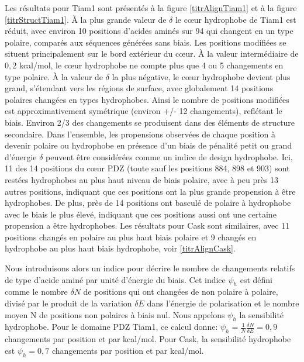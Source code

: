 Les résultats pour Tiam1 sont présentés à la figure \ref{titrAlignTiam1} et à la figure \ref{titrStructTiam1}. À la plus grande valeur de $\delta$ le cœur hydrophobe de Tiam1 est réduit, avec  environ 10 positions d'acides aminés sur 94 qui changent en un type polaire, comparés aux séquences générées sans biais. Les positions modifiées se situent principalement sur le bord extérieur du cœur. À la valeur intermédiaire de $0,2$ kcal/mol, le cœur hydrophobe ne compte plus que 4 ou 5 changements en type polaire. À la valeur de $\delta$ la plus négative, le cœur hydrophobe devient plus grand, s'étendant vers les régions de surface, avec globalement 14 positions polaires changées en types hydrophobes. Ainsi le nombre de positions modifiées est approximativement symétrique (environ +/- 12 changements), reflétant le biais. Environ 2/3 des changements se produisent dans des éléments de structure secondaire. Dans l'ensemble, les propensions observées de chaque position à devenir polaire ou hydrophobe en présence d'un biais de pénalité petit ou grand d'énergie $\delta$ peuvent être considérées comme un indice de design hydrophobe. Ici, 11 des 14 positions du cœur PDZ (toute sauf les positions 884, 898 et 903) sont restées hydrophobes au plus haut niveau de biais polaire, avec à peu près 13 autres positions, indiquant que ces positions ont la plus grande propension à être hydrophobes. De plus, près de 14 positions ont basculé de polaire à hydrophobe avec le biais le plus élevé, indiquant que ces positions aussi ont une certaine propension a être hydrophobes. Les résultats pour Cask sont similaires, avec 11 positions changés en polaire au plus haut biais polaire et 9 changés en hydrophobe au plus haut biais hydrophobe, voir \ref{titrAlignCask}.

Nous introduisons alors un indice pour décrire le nombre de changements relatifs de type d'acide aminé par unité d'énergie du biais. Cet indice  $\psi_h$ est défini comme le nombre $\delta N$ de positions qui ont changées de non polaire à polaire, divisé par le produit de la variation $\delta E$ dans l'énergie de polarisation et le nombre moyen N de positions non polaires à biais nul. Nous appelons $\psi_h$ la sensibilité hydrophobe. Pour le domaine PDZ Tiam1, ce calcul donne:
$\psi_h = \frac{1}{N} \frac{\delta N}{\delta E} = 0,9$ changements par position et par kcal/mol. Pour Cask, la sensibilité hydrophobe  est  $\psi_h = 0,7$ changements par position et par kcal/mol.


